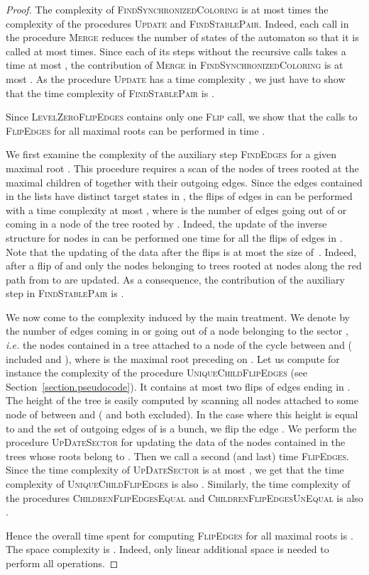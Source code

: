 \documentclass[11pt,a4paper]{article}
\newcommand{\ie}{{\itshape i.e.}\xspace }
\begin{document}
\begin{proof} 
  The complexity of \textsc{FindSynchronizedColoring} is at most  times the
  complexity of the procedures \textsc{Update} and
  \textsc{FindStablePair}.  Indeed, each call in the procedure
  \textsc{Merge} reduces the number of states of the automaton so that
  it is called at most  times. Since each of its steps without the
  recursive calls takes a time at most , the contribution of
  \textsc{Merge} in \textsc{FindSynchronizedColoring} is at most .  As the
  procedure \textsc{Update} has a time complexity , we just
  have to show that the time complexity of
  \textsc{FindStablePair} is .

  Since \textsc{LevelZeroFlipEdges} contains only one \textsc{Flip}
  call, we show that the calls to \textsc{FlipEdges} for all
  maximal roots  can be performed in time .

  We first examine the complexity of the auxiliary step
  \textsc{FindEdges} for a given maximal root .  This
  procedure requires a scan of the nodes of trees  rooted at the
  maximal children  of  together with their outgoing edges.
  Since the edges contained in the lists  have distinct target
  states in , the flips of edges in  can be performed with a
  time complexity at most , where  is the number of edges
  going out of or coming in a node of the tree  rooted by .
  Indeed, the update of the inverse structure for nodes in  can be
  performed one time for all the flips of edges in .  Note that
  the updating of the data after the flips is at most the size
  of~. Indeed, after a flip of  and  only the
  nodes belonging to trees rooted at nodes along the red path from 
  to  are updated.  As a consequence, the contribution of the
  auxiliary step in \textsc{FindStablePair} is .

  We now come to the complexity induced by the main treatment. We
  denote by  the number of edges coming in or going out of a
  node belonging to the sector , \ie the nodes contained in a
  tree attached to a node of the cycle between  and  (
  included and ), where  is the maximal root preceding  on
  . Let us compute for instance the complexity of the procedure
  \textsc{UniqueChildFlipEdges} (see
  Section~\ref{section.pseudocode}).  It contains at most two flips of
  edges ending in .  The height of the tree  is easily
  computed by scanning all nodes attached to some node of  between
   and  ( and  both excluded). In the case where this
  height is equal to  and the set of outgoing edges of  is
  a bunch, we flip the edge .  We perform the procedure
  \textsc{UpDateSector} for updating the data of the nodes
  contained in the trees whose roots belong to .  Then we call
  a second (and last) time \textsc{FlipEdges}.  Since the time
  complexity of \textsc{UpDateSector} is at most ,
  we get that the time complexity of
  \textsc{UniqueChildFlipEdges} is also
  . Similarly, the time complexity of the procedures
  \textsc{ChildrenFlipEdgesEqual} and
  \textsc{ChildrenFlipEdgesUnEqual} is also .

Hence the overall time spent for computing \textsc{FlipEdges}
for all maximal roots  is .
  The space complexity is . Indeed, only linear
  additional space is needed to perform all operations.
\end{proof}
\end{document}
